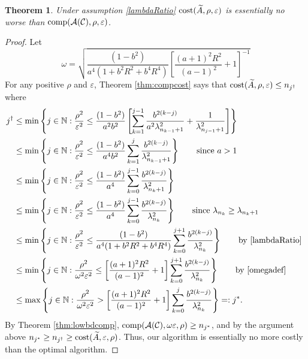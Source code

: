 \documentclass[final]{elsarticle}
\newtheorem{theorem}{Theorem}
\theoremstyle{definition}
\theoremstyle{remark}
\begin{document}
\begin{theorem}
\label{thm:CostNoWorse}
Under assumption \eqref{lambdaRatio} $\operatorname{cost}(\widetilde{A},\rho,\varepsilon)$ is essentially no worse than $\operatorname{comp}(\mathcal{A}(\mathcal{C}),\rho,\varepsilon)$.
\end{theorem}
\begin{proof}
Let  
\begin{equation} \label{omegadef}
    \omega = \sqrt{\frac{(1 - b^2)}{a^4(1 + b^2R^2 + b^4R^4)}\left[\frac{(a+1)^{2} R^2 }{(a-1)^2} + 1\right]^{-1}}
\end{equation}
For any positive $\rho$ and $\varepsilon$, Theorem \ref{thm:compcost} says that $\operatorname{cost}(\widetilde{A},\rho,\varepsilon) \le n_{j^\dagger}$ where 
\begin{align*} 
j^\dagger &\le \min \left \{j \in \mathbb{N} : \frac{\rho^2}{\varepsilon^2} \le \frac{(1 - b^2)}{a^2b^2} \left[ \sum_{k=1}^{j-1} \frac{b^{2(k-j)}}{a^2\lambda_{n_{k-1}+1}^2} + \frac{1}{\lambda_{n_{j-1}+1}^2}\right]   \right\} \\
&\le \min \left \{j \in \mathbb{N} : \frac{\rho^2}{\varepsilon^2} \le \frac{(1 - b^2)}{a^4b^2} \sum_{k=1}^{j} \frac{b^{2(k-j)}}{\lambda_{n_{k-1}+1}^2} \right\} \qquad \text{since } a > 1\\
&\le \min \left \{j \in \mathbb{N} : \frac{\rho^2}{\varepsilon^2} \le \frac{(1 - b^2)}{a^4} \sum_{k=0}^{j-1} \frac{b^{2(k-j)}}{\lambda_{n_{k}+1}^2} \right\} \\
&\le \min \left \{j \in \mathbb{N} : \frac{\rho^2}{\varepsilon^2} \le \frac{(1 - b^2)}{a^4} \sum_{k=0}^{j-1} \frac{b^{2(k-j)}}{\lambda_{n_{k}}^2} \right\} \qquad \text{since } \lambda_{n_k} \ge \lambda_{n_k+1}\\
&\le \min \left \{j \in \mathbb{N} : \frac{\rho^2}{\varepsilon^2} \le \frac{(1 - b^2)}{a^4(1 + b^2R^2 + b^4R^4)} \sum_{k=0}^{j+1} \frac{b^{2(k-j)}}{\lambda_{n_{k}}^2} \right\} \qquad \text{by \eqref{lambdaRatio} } \\
&\le \min \left \{j \in \mathbb{N} : \frac{\rho^2}{\omega^2 \varepsilon^2} \le \left[\frac{(a+1)^{2} R^2 }{(a-1)^2} + 1\right] \sum_{k=0}^{j+1} \frac{b^{2(k-j)}}{\lambda_{n_{k}}^2} \right\} \qquad \text{by \eqref{omegadef} } \\
&\le \max \left \{j \in \mathbb{N} : \frac{\rho^2}{\omega^2 \varepsilon^2} > \left[\frac{(a+1)^{2} R^2 }{(a-1)^2} + 1\right] \sum_{k=0}^{j} \frac{b^{2(k-j)}}{\lambda_{n_{k}}^2} \right\} =:j^*.
\end{align*}
By Theorem \ref{thm:lowbdcomp}, $\operatorname{comp}(\mathcal{A}(\mathcal{C}),\omega\varepsilon,\rho) \ge n_{j^*}$, and by the argument above $n_{j^*} \ge n_{j^\dagger} \ge \operatorname{cost}(\widetilde{A},\varepsilon,\rho)$.  Thus, our algorithm is essentially no more costly than the optimal algorithm.
\end{proof}
\end{document}
